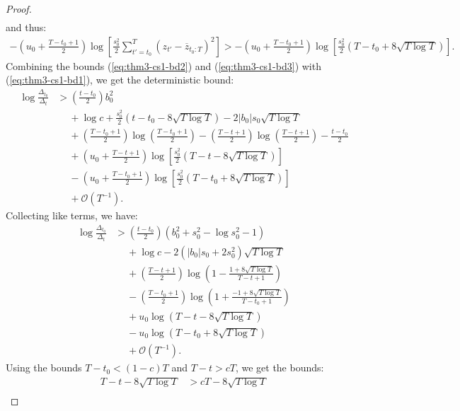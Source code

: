 \begin{proof}
\begin{align*}
\end{align*}
and thus:
\begin{align}
    -\left(u_0 + \frac{T - t_0 +1}{2}\right)\log\left[ \frac{s_0^2}{2}\sum_{t'=t_0}^T (z_{t'} - \overline{z}_{t_0:T})^2 \right]  > - \left(u_0 + \frac{T - t_0 +1}{2}\right)\log\left[ \frac{s_0^2}{2} \left(T - t_0 + 8\sqrt{T \log T}\right)\right]. \label{eq:thm3-cs1-bd3}
\end{align}
Combining the bounds (\ref{eq:thm3-cs1-bd2}) and (\ref{eq:thm3-cs1-bd3}) with (\ref{eq:thm3-cs1-bd1}), we get the deterministic bound:
\begin{align*}
    \log \frac{\Delta_{t_0}}{\Delta_t} &> \left(\frac{t-t_0}{2}\right)b_0^2\\
    &\quad\: + \log c + \frac{s_0^2}{2}\left(t - t_0 - 8 \sqrt{T\log T}\right) - 2 |b_0| s_0 \sqrt{T \log T} \\
    &\quad\: + \left(\frac{T - t_0 + 1}{2}\right) \log\left(\frac{T-t_0+1}{2}\right) - \left(\frac{T - t+1}{2}\right) \log\left(\frac{T-t+1}{2}\right) - \frac{t-t_0}{2} \\
    &\quad\: + \left(u_0 + \frac{T - t +1}{2}\right)\log\left[ \frac{s_0^2}{2} \left(T - t - 8\sqrt{T \log T}\right)\right] \\
    &\quad\: - \left(u_0 + \frac{T - t_0 +1}{2}\right)\log\left[\frac{s_0^2}{2}\left(T-t_0 + 8\sqrt{T \log T}\right) \right] \\
    &\quad\: + \mathcal{O}(T^{-1}).
\end{align*}
Collecting like terms, we have:
\begin{align*}
    \log \frac{\Delta_{t_0}}{\Delta_t} &> \left(\frac{t-t_0}{2}\right)(b_0^2 + s_0^2 - \log s_0^2 - 1) \\
    &\quad\: + \log c - 2 (|b_0|s_0 +2s_0^2) \sqrt{T \log T} \\
    &\quad\: + \left(\frac{T - t+1}{2}\right)\log\left(1 - \frac{1 + 8\sqrt{T \log T}}{T-t+1}\right)\\
    &\quad\: - \left(\frac{T - t_0+1}{2}\right)\log\left(1 + \frac{-1 + 8\sqrt{T \log T}}{T-t_0+1}\right)  \\
    &\quad\: + u_0\log\left(T - t - 8\sqrt{T \log T}\right) \\
    &\quad\: - u_0\log\left(T-t_0 + 8\sqrt{T \log T}\right) \\
    &\quad\: + \mathcal{O}(T^{-1}).
\end{align*}
Using the bounds $T - t_0 < (1-c)T$ and $T-t > cT$, we get the bounds:
\begin{align*}
    T-t - 8 \sqrt{T\log T} &> cT - 8 \sqrt{T\log T} \\

\end{align*}
\end{proof}

